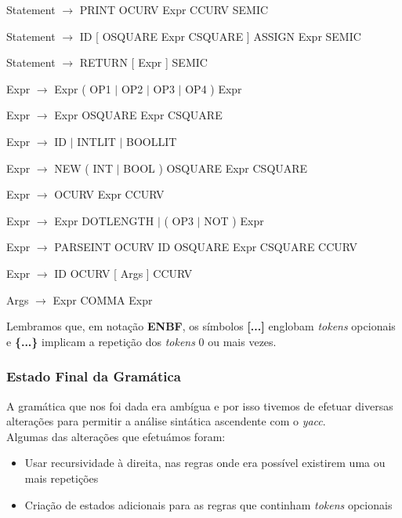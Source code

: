 \documentclass[12pt]{article}
\begin{document}
\hspace{-1cm}Statement $\rightarrow$ PRINT OCURV Expr CCURV SEMIC

\hspace{-1cm}Statement $\rightarrow$ ID [ OSQUARE Expr CSQUARE ] ASSIGN Expr SEMIC

\hspace{-1cm}Statement $\rightarrow$ RETURN [ Expr ] SEMIC

\hspace{-1cm}Expr $\rightarrow$ Expr ( OP1 $\mid$ OP2 $\mid$ OP3 $\mid$ OP4 ) Expr

\hspace{-1cm}Expr $\rightarrow$ Expr OSQUARE Expr CSQUARE

\hspace{-1cm}Expr $\rightarrow$ ID $\mid$ INTLIT $\mid$ BOOLLIT

\hspace{-1cm}Expr $\rightarrow$ NEW ( INT $\mid$ BOOL ) OSQUARE Expr CSQUARE

\hspace{-1cm}Expr $\rightarrow$ OCURV Expr CCURV

\hspace{-1cm}Expr $\rightarrow$ Expr DOTLENGTH $\mid$ ( OP3 $\mid$ NOT ) Expr

\hspace{-1cm}Expr $\rightarrow$ PARSEINT OCURV ID OSQUARE Expr CSQUARE CCURV

\hspace{-1cm}Expr $\rightarrow$ ID OCURV [ Args ] CCURV

\hspace{-1cm}Args $\rightarrow$ Expr { COMMA Expr }

\vspace{0.5cm}

Lembramos que, em notação \textbf{ENBF}, os símbolos \textbf{[...]} englobam \emph{tokens} opcionais e \textbf{\{...\}} implicam a repetição dos \emph{tokens} 0 ou mais vezes.



\subsubsection{Estado Final da Gramática}
\par A gramática que nos foi dada era ambígua e por isso tivemos de efetuar diversas alterações para permitir a análise sintática ascendente com o \emph{yacc}.\\
Algumas das alterações que efetuámos foram:
\begin{itemize}
	\item Usar recursividade à direita, nas regras onde era possível existirem uma ou mais repetições
	\item Criação de estados adicionais para as regras que continham \emph{tokens} opcionais
\end{itemize}
\end{document}
